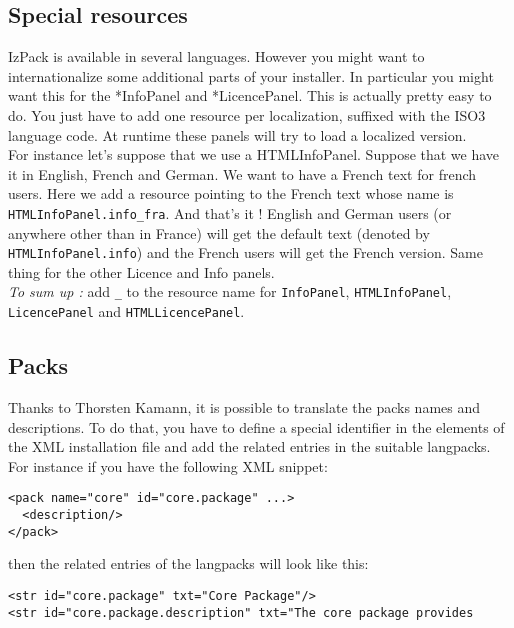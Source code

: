 \subsection{Special resources}

IzPack is available in several languages. However you might want to
internationalize some additional parts of your installer. In particular you
might want this for the *InfoPanel and *LicencePanel. This is actually pretty
easy to do. You just have to add one resource per localization, suffixed with the
ISO3 language code. At runtime these panels will try to load a localized version.\\

For instance let's suppose that we use a HTMLInfoPanel. Suppose that we have it
in English, French and German. We want to have a French text for french users.
Here we add a resource pointing to the French text whose name is
\texttt{HTMLInfoPanel.info\_fra}. And that's it ! English and German users (or
anywhere other than in France) will get the default text (denoted by 
\texttt{HTMLInfoPanel.info}) and the French users will get the French version.
Same thing for the other Licence and Info panels.\\

\noindent
\textit{To sum up :} add \texttt{\_<iso3 code>} to the resource name for
\texttt{InfoPanel}, \texttt{HTMLInfoPanel}, \texttt{LicencePanel} and
\texttt{HTMLLicencePanel}.\\

\subsection{Packs}

Thanks to Thorsten Kamann, it is possible to translate the packs names and
descriptions. To do that, you have to define a special identifier in the
elements of the XML installation file and add the related entries in the
suitable langpacks. For instance if you have the following XML snippet:
\begin{verbatim}
<pack name="core" id="core.package" ...>
  <description/>
</pack>
\end{verbatim}
then the related entries of the langpacks will look like this:
\begin{verbatim}
<str id="core.package" txt="Core Package"/>
<str id="core.package.description" txt="The core package provides
\end{verbatim}
